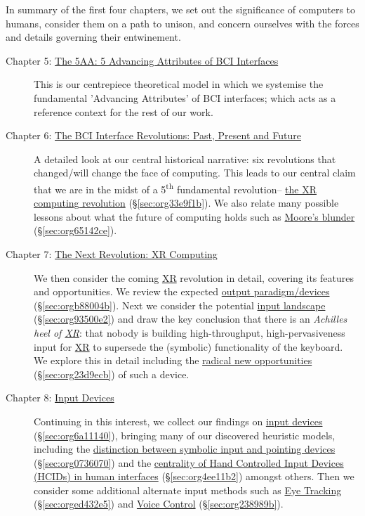 \documentclass[logo,bsc,singlespacing,parskip]{infthesis}
\begin{document}
In summary of the first four chapters, we set out the significance of computers to humans, consider them on a path to unison, and concern ourselves with the forces and details governing their entwinement.

\begin{description}
\item[{Chapter 5: \hyperref[sec:org7f79682]{The 5AA: 5 Advancing Attributes of BCI Interfaces}}] This is our centrepiece theoretical model in which we systemise the fundamental 'Advancing Attributes' of BCI interfaces; which acts as a reference context for the rest of our work.

\item[{Chapter 6: \hyperref[sec:orgbbbb2de]{The BCI Interface Revolutions: Past, Present and Future}}] A detailed look at our central historical narrative: six revolutions that changed/will change the face of computing.
This leads to our central claim that we are in the midst of a 5\textsuperscript{th} fundamental revolution-- \hyperref[sec:org33e9f1b]{the XR computing revolution} (\S \ref{sec:org33e9f1b}).
We also relate many possible lessons about what the future of computing holds such as \hyperref[sec:org65142ce]{Moore's blunder} (\S \ref{sec:org65142ce}).

\item[{Chapter 7: \hyperref[sec:orgb165994]{The Next Revolution: XR Computing}}] We then consider the coming \hyperref[org39cbd51]{XR} revolution in detail, covering its features and opportunities.
We review the expected \hyperref[sec:orgb88004b]{output paradigm/devices} (\S \ref{sec:orgb88004b}).
Next we consider the potential \hyperref[sec:org93500e2]{input landscape} (\S \ref{sec:org93500e2}) and draw the key conclusion that there is an \emph{Achilles heel of \hyperref[org39cbd51]{XR}}: that nobody is building high-throughput, high-pervasiveness input for \hyperref[org39cbd51]{XR} to supersede the (symbolic) functionality of the keyboard.
We explore this in detail including the \hyperref[sec:org23d9ecb]{radical new opportunities} (\S \ref{sec:org23d9ecb}) of such a device.

\item[{Chapter 8: \hyperref[sec:org6a11140]{Input Devices}}] Continuing in this interest, we collect our findings on \hyperref[sec:org6a11140]{input devices} (\S \ref{sec:org6a11140}), bringing many of our discovered heuristic models, including the \hyperref[sec:org0736070]{distinction between symbolic input and pointing devices} (\S \ref{sec:org0736070}) and the \hyperref[sec:org4ee11b2]{centrality of Hand Controlled Input Devices (HCIDs) in human interfaces} (\S \ref{sec:org4ee11b2}) amongst others.
Then we consider some additional alternate input methods such as \hyperref[sec:orged432e5]{Eye Tracking} (\S \ref{sec:orged432e5}) and \hyperref[sec:org238989b]{Voice Control} (\S \ref{sec:org238989b}).


\end{description}
\end{document}
